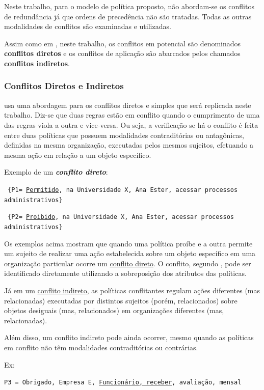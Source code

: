 Neste trabalho, para o modelo de política proposto, não abordam-se os conflitos de redundância já que ordens de precedência não são tratadas. Todas as outras modalidades de conflitos são examinadas e utilizadas.

Assim como em \cite[p. 24]{sarkis2017}, neste trabalho, os conflitos em potencial são denominados \textbf{conflitos diretos} e os conflitos de aplicação são abarcados pelos chamados \textbf{conflitos indiretos}.

\subsubsection{Conflitos Diretos e Indiretos}
\cite{dunlop_dynamic_2002} usa uma abordagem para os conflitos diretos e simples que será replicada neste trabalho. Diz-se que duas regras estão em conflito quando o cumprimento de uma das regras viola a outra e vice-versa. Ou seja, a verificação se há o conflito é feita entre duas políticas que possuem modalidades contraditórias ou antagônicas, definidas na mesma organização, executadas pelos mesmos sujeitos, efetuando a mesma ação em relação a um objeto específico.

Exemplo de um \textit{\textbf{conflito direto}}:

{\scriptsize \texttt{ \{P1= {\underline{Permitido}, na Universidade X, Ana Ester, acessar processos administrativos\} }}}

{\scriptsize \texttt{ \{P2= {\underline{Proibido}, na Universidade X, Ana Ester, acessar processos administrativos\} }}}

Os exemplos acima mostram que quando uma política proíbe e a outra permite um sujeito de realizar uma ação estabelecida sobre um objeto específico em uma organização particular ocorre um \underline{conflito direto}. O conflito, segundo \cite{autrel_motorbac_nodate}, pode ser identificado diretamente utilizando a sobreposição dos atributos das políticas.

Já em um \underline{conflito indireto,} as políticas conflitantes regulam ações diferentes (mas relacionadas) executadas por distintos sujeitos (porém, relacionados) sobre objetos desiguais (mas, relacionados) em organizações diferentes (mas, relacionadas). \cite[p.24]{sarkis2017}

Além disso, um conflito indireto pode ainda ocorrer, mesmo quando as políticas em conflito não têm modalidades contraditórias ou contrárias.

Ex:

{\scriptsize \texttt{P3 = {Obrigado, Empresa E, \underline{Funcionário, receber}, avaliação, mensal}}}


